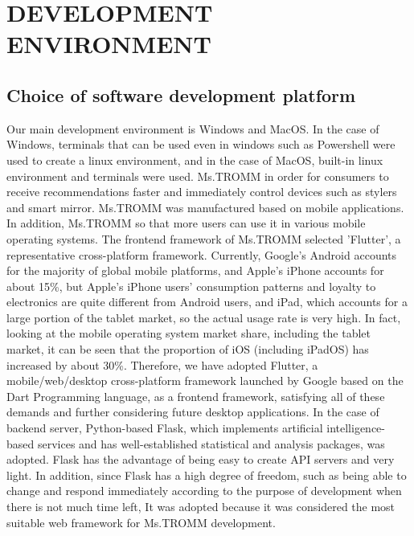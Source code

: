 \documentclass[conference]{IEEEtran}
\begin{document}
\break

\section{DEVELOPMENT ENVIRONMENT }
\subsection{Choice of software development platform}
Our main development environment is Windows and MacOS. In the case of Windows, terminals that can be used even in windows such as Powershell were used to create a linux environment, and in the case of MacOS, built-in linux environment and terminals were used. Ms.TROMM in order for consumers to receive recommendations faster and immediately control devices such as stylers and smart mirror. Ms.TROMM was manufactured based on mobile applications. In addition, Ms.TROMM so that more users can use it in various mobile operating systems. The frontend framework of Ms.TROMM selected 'Flutter', a representative cross-platform framework. Currently, Google's Android accounts for the majority of global mobile platforms, and Apple's iPhone accounts for about 15\%, but Apple's iPhone users' consumption patterns and loyalty to electronics are quite different from Android users, and iPad, which accounts for a large portion of the tablet market, so the actual usage rate is very high. In fact, looking at the mobile operating system market share, including the tablet market, it can be seen that the proportion of iOS (including iPadOS) has increased by about 30\%. Therefore, we have adopted Flutter, a mobile/web/desktop cross-platform framework launched by Google based on the Dart Programming language, as a frontend framework, satisfying all of these demands and further considering future desktop applications. In the case of backend server, Python-based Flask, which implements artificial intelligence-based services and has well-established statistical and analysis packages, was adopted. Flask has the advantage of being easy to create API servers and very light. In addition, since Flask has a high degree of freedom, such as being able to change and respond immediately according to the purpose of development when there is not much time left, It was adopted because it was considered the most suitable web framework for Ms.TROMM development.\\ \\ 
\end{document}
